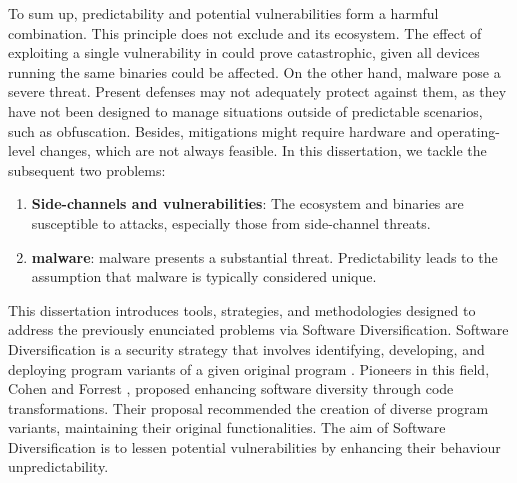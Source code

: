
To sum up, predictability and potential vulnerabilities form a harmful combination. 
This principle does not exclude \Wasm and its ecosystem.
The effect of exploiting a single vulnerability in \Wasm could prove catastrophic, given all devices running the same \Wasm binaries could be affected. 
On the other hand, \Wasm malware pose a severe threat. 
Present defenses may not adequately protect against them, as they have not been designed to manage situations outside of predictable scenarios, such as obfuscation. 
Besides, mitigations might require hardware and operating-level changes, which are not always feasible.
In this dissertation, we tackle the subsequent two problems:

\begin{enumerate}[label=\textbf{P\arabic*}, ref=\textbf{P\arabic*}]

	\item \label{prob4} \textbf{Side-channels and vulnerabilities}: The \Wasm ecosystem and binaries are susceptible to attacks, especially those from side-channel threats.
	
	\item \label{prob5} \textbf{\Wasm malware}: 
	\Wasm malware presents a substantial threat.
	Predictability leads to the assumption that malware is typically considered unique.

\end{enumerate}


\begin{comment}
\msection{Problem statement}

\end{comment}


This dissertation introduces tools, strategies, and methodologies designed to address the previously enunciated problems via Software Diversification.
Software Diversification is a security strategy that involves identifying, developing, and deploying program variants of a given original program \cite{okhravi2013survey}.
Pioneers in this field, Cohen \etal \cite{cohen1993operating} and Forrest \etal \cite{595185}, proposed enhancing software diversity through code transformations. 
Their proposal recommended the creation of diverse program variants, maintaining their original functionalities. 
The aim of Software Diversification is to lessen potential vulnerabilities by enhancing their behaviour unpredictability.




